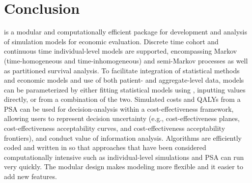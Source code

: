 \documentclass[article, nojss]{jss}\usepackage[]{graphicx}\usepackage[]{color}
\begin{document}
\section{Conclusion} \label{sec:conclusion}
 is a modular and computationally efficient  package for development and analysis of simulation models for economic evaluation. Discrete time cohort and continuous time individual-level models are supported, encompassing Markov (time-homogeneous and time-inhomogeneous) and semi-Markov processes as well as partitioned survival analysis. To facilitate integration of statistical methods and economic models and use of both patient- and aggregate-level data, models can be parameterized by either fitting statistical models using , inputting values directly, or from a combination of the two. Simulated costs and QALYs from a PSA can be used for decision-analysis within a cost-effectiveness framework, allowing users to represent decision uncertainty (e.g., cost-effectiveness planes, cost-effectiveness acceptability curves, and cost-effectiveness acceptability frontiers), and conduct value of information analysis. Algorithms are efficiently coded and written in  so that approaches that have been considered computationally intensive such as individual-level simulations and PSA can run very quickly. The modular design makes modeling more flexible and it easier to add new features. 








\end{document}
